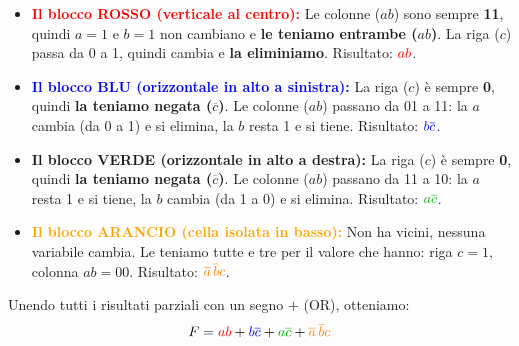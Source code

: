 \documentclass[11pt,a4paper]{report}
\begin{document}
\begin{itemize}
    \item \textcolor{red}{\textbf{Il blocco ROSSO (verticale al centro):}} Le colonne ($ab$) sono sempre \textbf{11}, quindi $a=1$ e $b=1$ non cambiano e \textbf{le teniamo entrambe ($ab$)}. La riga ($c$) passa da 0 a 1, quindi cambia e \textbf{la eliminiamo}. Risultato: $\textcolor{red}{ab}$.
    \item \textcolor{blue}{\textbf{Il blocco BLU (orizzontale in alto a sinistra):}} La riga ($c$) è sempre \textbf{0}, quindi \textbf{la teniamo negata ($\overline{c}$)}. Le colonne ($ab$) passano da 01 a 11: la $a$ cambia (da 0 a 1) e si elimina, la $b$ resta 1 e si tiene. Risultato: $\textcolor{blue}{b\overline{c}}$.
    \item \textcolor{green!70!black}{\textbf{Il blocco VERDE (orizzontale in alto a destra):}} La riga ($c$) è sempre \textbf{0}, quindi \textbf{la teniamo negata ($\overline{c}$)}. Le colonne ($ab$) passano da 11 a 10: la $a$ resta 1 e si tiene, la $b$ cambia (da 1 a 0) e si elimina. Risultato: $\textcolor{green!70!black}{a\overline{c}}$.
    \item \textcolor{orange}{\textbf{Il blocco ARANCIO (cella isolata in basso):}} Non ha vicini, nessuna variabile cambia. Le teniamo tutte e tre per il valore che hanno: riga $c=1$, colonna $ab=00$. Risultato: $\textcolor{orange}{\overline{a}\,\overline{b}c}$.
\end{itemize}

Unendo tutti i risultati parziali con un segno \textbf{$+$} (OR), otteniamo:
\[ F = \textcolor{red}{ab} + \textcolor{blue}{b\overline{c}} + \textcolor{green!70!black}{a\overline{c}} + \textcolor{orange}{\overline{a}\,\overline{b}c} \]

\vspace{1.5em}
\end{document}
